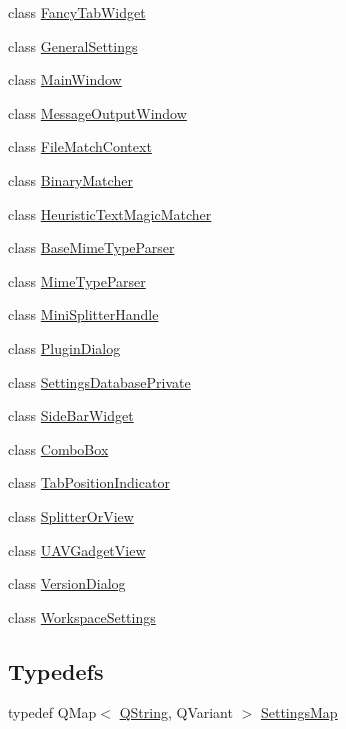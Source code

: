 \begin{DoxyCompactItemize}
\item 
class \hyperlink{class_core_1_1_internal_1_1_fancy_tab_widget}{Fancy\-Tab\-Widget}
\item 
class \hyperlink{class_core_1_1_internal_1_1_general_settings}{General\-Settings}
\item 
class \hyperlink{class_core_1_1_internal_1_1_main_window}{Main\-Window}
\item 
class \hyperlink{class_core_1_1_internal_1_1_message_output_window}{Message\-Output\-Window}
\item 
class \hyperlink{class_core_1_1_internal_1_1_file_match_context}{File\-Match\-Context}
\item 
class \hyperlink{class_core_1_1_internal_1_1_binary_matcher}{Binary\-Matcher}
\item 
class \hyperlink{class_core_1_1_internal_1_1_heuristic_text_magic_matcher}{Heuristic\-Text\-Magic\-Matcher}
\item 
class \hyperlink{class_core_1_1_internal_1_1_base_mime_type_parser}{Base\-Mime\-Type\-Parser}
\item 
class \hyperlink{class_core_1_1_internal_1_1_mime_type_parser}{Mime\-Type\-Parser}
\item 
class \hyperlink{class_core_1_1_internal_1_1_mini_splitter_handle}{Mini\-Splitter\-Handle}
\item 
class \hyperlink{class_core_1_1_internal_1_1_plugin_dialog}{Plugin\-Dialog}
\item 
class \hyperlink{class_core_1_1_internal_1_1_settings_database_private}{Settings\-Database\-Private}
\item 
class \hyperlink{class_core_1_1_internal_1_1_side_bar_widget}{Side\-Bar\-Widget}
\item 
class \hyperlink{class_core_1_1_internal_1_1_combo_box}{Combo\-Box}
\item 
class \hyperlink{class_core_1_1_internal_1_1_tab_position_indicator}{Tab\-Position\-Indicator}
\item 
class \hyperlink{class_core_1_1_internal_1_1_splitter_or_view}{Splitter\-Or\-View}
\item 
class \hyperlink{class_core_1_1_internal_1_1_u_a_v_gadget_view}{U\-A\-V\-Gadget\-View}
\item 
class \hyperlink{class_core_1_1_internal_1_1_version_dialog}{Version\-Dialog}
\item 
class \hyperlink{class_core_1_1_internal_1_1_workspace_settings}{Workspace\-Settings}
\end{DoxyCompactItemize}
\subsection*{Typedefs}
\begin{DoxyCompactItemize}
\item 
typedef Q\-Map$<$ \hyperlink{group___u_a_v_objects_plugin_gab9d252f49c333c94a72f97ce3105a32d}{Q\-String}, Q\-Variant $>$ \hyperlink{group___core_plugin_ga82251e6825f9c8021ae18f52f510c3fa}{Settings\-Map}
\end{DoxyCompactItemize}
